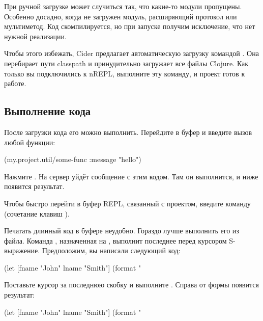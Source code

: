 При ручной загрузке может случиться так, что какие-то модули пропущены. Особенно досадно, когда не загружен модуль, расширяющий протокол или мультиметод. Код скомпилируется, но при запуске получим исключение, что нет нужной реализации.

Чтобы этого избежать, Cider предлагает автоматическую загрузку командой . Она перебирает пути classpath и принудительно загружает все файлы Clojure. Как только вы подключились к nREPL, выполните эту команду, и проект готов к работе.

\subsection{Выполнение кода}

После загрузки кода его можно выполнить. Перейдите в буфер  и введите вызов любой функции:

\begin{english}
  \begin{clojure}
(my.project.util/some-func {:message "hello"})
  \end{clojure}
\end{english}

Нажмите \enter. На сервер уйдёт сообщение с этим кодом. Там он выполнится, и ниже появится результат.

Чтобы быстро перейти в буфер REPL, связанный с проектом, введите команду  (сочетание клавиш ).

Печатать длинный код в буфере  неудобно. Гораздо лучше выполнить его из файла. Команда , назначенная на , выполнит последнее перед курсором S-выражение. Предположим, вы написали следующий код:

\begin{english}
  \begin{clojure}
(let [fname "John"
      lname "Smith"]
  (format "%
  \end{clojure}
\end{english}

Поставьте курсор за последнюю скобку и выполните . Справа от формы появится результат:

\begin{english}
  \begin{clojure}
(let [fname "John"
      lname "Smith"]
  (format "%
  \end{clojure}
\end{english}

